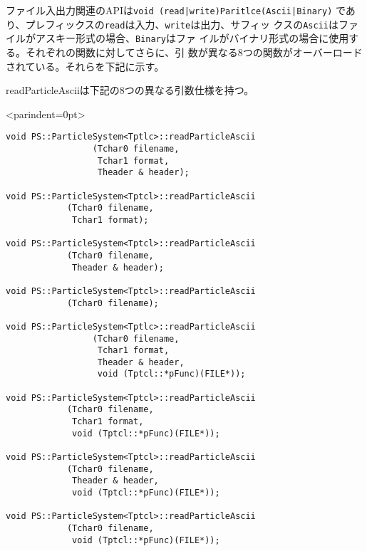 ファイル入出力関連のAPIは{\tt void (read|write)Paritlce(Ascii|Binary)}
  であり、プレフィックスの{\tt read}は入力、{\tt write}は出力、サフィッ
  クスの{\tt Ascii}はファイルがアスキー形式の場合、{\tt Binary}はファ
  イルがバイナリ形式の場合に使用する。それぞれの関数に対してさらに、引
  数が異なる8つの関数がオーバーロードされている。それらを下記に示す。


\label{sec:readParticleAscii}

readParticleAsciiは下記の8つの異なる引数仕様を持つ。
\begin{breakitembox}<parindent=0pt>{}
\begin{verbatim}
void PS::ParticleSystem<Tptlc>::readParticleAscii
                 (Tchar0 filename,
                  Tchar1 format,
                  Theader & header);
                  
void PS::ParticleSystem<Tptcl>::readParticleAscii
            (Tchar0 filename,
             Tchar1 format);
             
void PS::ParticleSystem<Tptcl>::readParticleAscii
            (Tchar0 filename,
             Theader & header);
             
void PS::ParticleSystem<Tptcl>::readParticleAscii
            (Tchar0 filename);
            
void PS::ParticleSystem<Tptlc>::readParticleAscii
                 (Tchar0 filename,
                  Tchar1 format,
                  Theader & header,
                  void (Tptcl::*pFunc)(FILE*));
                  
void PS::ParticleSystem<Tptcl>::readParticleAscii
            (Tchar0 filename,
             Tchar1 format,
             void (Tptcl::*pFunc)(FILE*));
             
void PS::ParticleSystem<Tptcl>::readParticleAscii
            (Tchar0 filename,
             Theader & header,
             void (Tptcl::*pFunc)(FILE*));
             
void PS::ParticleSystem<Tptcl>::readParticleAscii
            (Tchar0 filename,
             void (Tptcl::*pFunc)(FILE*));
\end{verbatim}
\end{breakitembox}

